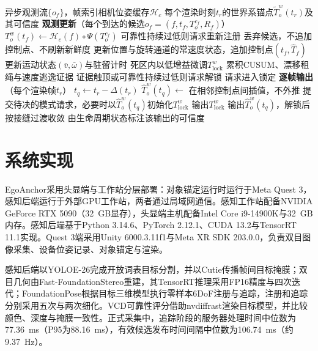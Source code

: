 \documentclass[review]{vgtc}
\begin{document}
\begin{algorithm}[t]
\caption{锚定运行时的两条更新通路}
\label{alg:runtime}
\small
\begin{algorithmic}[1]
\Require 异步观测流$\{o_f\}$，帧索引相机位姿缓存$\mathcal{H}_c$
\Ensure 每个渲染时刻$t_r$的世界系锚点$\widetilde{T}_o^w(t_r)$及其可信度
\Statex \textbf{观测更新}（每个到达的候选$o_f = (f, t_f, T_o^{c_f}, R_f)$）
\State $T_o^w(t_f) \gets \mathcal{H}_c(f) \circ \Psi(T_o^{c_f})$ 
\State 可靠性持续过低则请求重新注册
 
  \State 丢弃候选，不追加控制点、不刷新新鲜度
\Else
  \State 更新位置与旋转通道的常速度状态，追加控制点$(t_f, \widehat{T}_f)$
  \State 更新运动状态$(\bar{v}, \bar{\omega})$与驻留计时
    \State 死区内以低增益微调$T_{\mathrm{lock}}^w$ 
    \State 累积CUSUM、漂移租绳与速度逃逸证据 
    \State 证据触顶或可靠性持续过低则请求解锁 
    \State 请求进入锁定
  \EndIf
\EndIf
\Statex \textbf{逐帧输出}（每个渲染帧$t_r$）
\State $t_q \gets t_r - \Delta(t_r)$ 
\State $\widehat{T}_o^w(t_q) \gets$ 在相邻控制点间插值，不外推 
\State 提交待决的模式请求，必要时以$\widehat{T}_o^w(t_q)$初始化$T_{\mathrm{lock}}^w$
  \State 输出$T_{\mathrm{lock}}^w$ 
\Else
  \State 输出$\widehat{T}_o^w(t_q)$，解锁后按接缝过渡收敛
\EndIf
\State 由生命周期状态标注该输出的可信度
\end{algorithmic}
\end{algorithm}

\section{系统实现}\label{sec:implementation}

EgoAnchor采用头显端与工作站分层部署：对象锚定运行时运行于Meta Quest 3，感知后端运行于外部GPU工作站，两者通过局域网通信。感知工作站配备NVIDIA GeForce RTX 5090（32~GB显存），头显端主机配备Intel Core i9-14900K与32~GB内存。感知后端基于Python 3.14.6、PyTorch 2.12.1、CUDA 13.2与TensorRT 11.1实现。Quest 3端采用Unity 6000.3.11f1与Meta XR SDK 203.0.0，负责双目图像采集、设备位姿记录、对象锚定与渲染。

感知后端以YOLOE-26完成开放词表目标分割，并以Cutie传播帧间目标掩膜；双目几何由Fast-FoundationStereo重建，其TensorRT推理采用FP16精度与四次迭代；FoundationPose根据目标三维模型执行零样本6DoF注册与追踪，注册和追踪分别采用五次与两次细化。VCD可靠性评分借助nvdiffrast渲染目标模型，并比较颜色、深度与掩膜一致性。正式采集中，追踪阶段的服务器处理时间中位数为77.36~ms（P95为88.16~ms），有效候选发布时间间隔中位数为106.74~ms（约9.37~Hz）。
\end{document}

